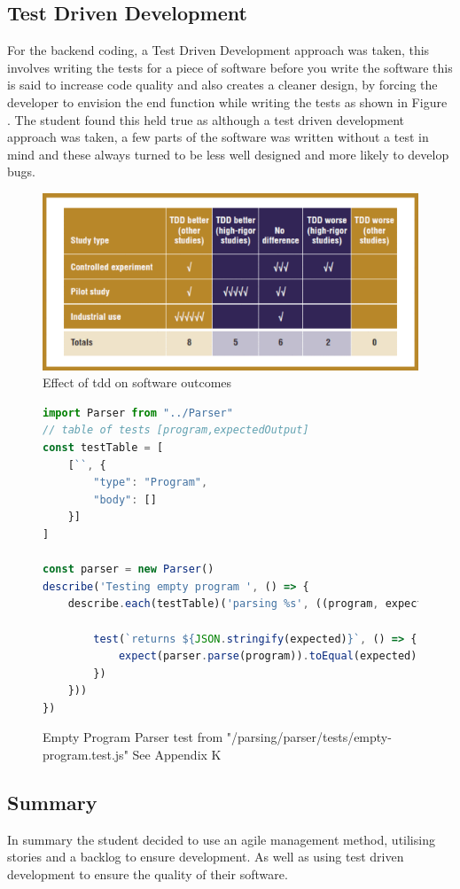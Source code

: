 \subsection{Test Driven Development}
For the backend coding, a Test Driven Development approach was taken, this involves writing the tests for a piece of software before you write the software 
this is said to increase code quality and also creates a cleaner design, by forcing the developer to envision the end function while writing the tests as shown in Figure 
 \cite{tdd}.
\newline
The student found this held true as although a test driven development approach was taken, a few parts of the software was written without a test in mind and these 
always turned to be less well designed and more likely to develop bugs.
\begin{figure}
    \includegraphics[width=.4\textwidth]{images/tdd effect.png}
    \caption{Effect of tdd on software outcomes \cite{tdd}}
    \label{fig:tdd}
\end{figure}
\begin{figure}[h]
\begin{lstlisting}[language=Javascript]
import Parser from "../Parser"
// table of tests [program,expectedOutput]
const testTable = [
    [``, {
        "type": "Program",
        "body": []
    }]        
]
        
const parser = new Parser()
describe('Testing empty program ', () => {
    describe.each(testTable)('parsing %s', ((program, expected) => {
        
        test(`returns ${JSON.stringify(expected)}`, () => {
            expect(parser.parse(program)).toEqual(expected)
        })
    }))
})
\end{lstlisting}
    \caption{Empty Program Parser test from "/parsing/parser/tests/empty-program.test.js" See Appendix K}
    \label{fig:example-test}
\end{figure}

\subsection{Summary}
In summary the student decided to use an agile management method, utilising stories and a backlog to ensure development. As well as using test driven development to ensure 
the quality of their software.